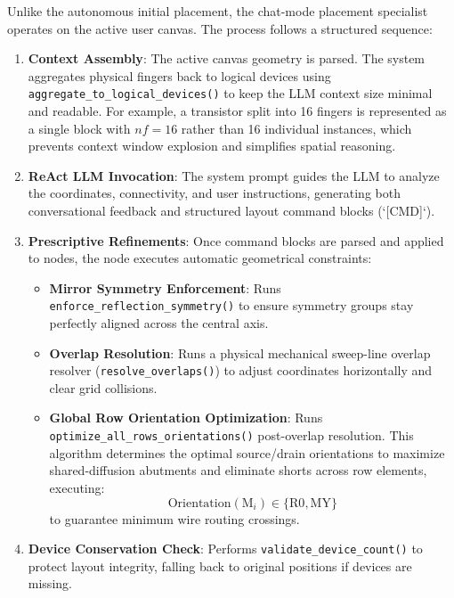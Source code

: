Unlike the autonomous initial placement, the chat-mode placement specialist operates on the active user canvas. The process follows a structured sequence:
\begin{enumerate}
    \item \textbf{Context Assembly}: The active canvas geometry is parsed. The system aggregates physical fingers back to logical devices using \texttt{aggregate\_}\allowbreak\texttt{to\_}\allowbreak\texttt{logical\_}\allowbreak\texttt{devices()} to keep the LLM context size minimal and readable. For example, a transistor split into 16 fingers is represented as a single block with $nf=16$ rather than 16 individual instances, which prevents context window explosion and simplifies spatial reasoning.
    \item \textbf{ReAct LLM Invocation}: The system prompt guides the LLM to analyze the coordinates, connectivity, and user instructions, generating both conversational feedback and structured layout command blocks (`[CMD]`).
    \item \textbf{Prescriptive Refinements}: Once command blocks are parsed and applied to nodes, the node executes automatic geometrical constraints:
    \begin{itemize}
        \item \textbf{Mirror Symmetry Enforcement}: Runs \texttt{enforce\_}\allowbreak\texttt{reflection\_}\allowbreak\texttt{symmetry()} to ensure symmetry groups stay perfectly aligned across the central axis.
        \item \textbf{Overlap Resolution}: Runs a physical mechanical sweep-line overlap resolver (\texttt{resolve\_}\allowbreak\texttt{overlaps()}) to adjust coordinates horizontally and clear grid collisions.
        \item \textbf{Global Row Orientation Optimization}: Runs \texttt{optimize\_}\allowbreak\texttt{all\_}\allowbreak\texttt{rows\_}\allowbreak\texttt{orientations()} post-overlap resolution. This algorithm determines the optimal source/drain orientations to maximize shared-diffusion abutments and eliminate shorts across row elements, executing:
        \begin{equation}
            \text{Orientation}(\text{M}_i) \in \{\text{R0}, \text{MY}\}
        \end{equation}
        to guarantee minimum wire routing crossings.
    \end{itemize}
    \item \textbf{Device Conservation Check}: Performs \texttt{validate\_}\allowbreak\texttt{device\_}\allowbreak\texttt{count()} to protect layout integrity, falling back to original positions if devices are missing.
\end{enumerate}

